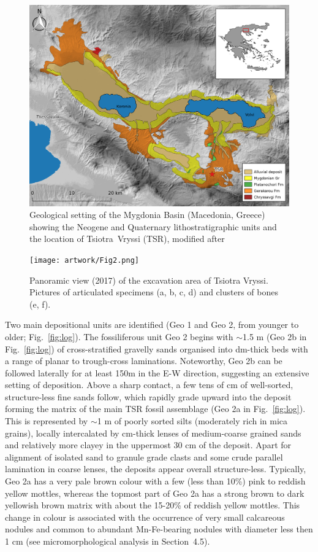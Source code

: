 \documentclass[review,times,authoryear]{elsarticle} %
\begin{document}
\begin{figure}[]
  \centering
  \includegraphics[width=1\textwidth]{artwork/Fig1.png}
  \caption{Geological setting of the Mygdonia Basin (Macedonia, Greece) showing the Neogene and Quaternary lithostratigraphic units and the location of Tsiotra~Vryssi (TSR), modified after \cite{Koufos1995}}
  \label{fig:1}
\end{figure}

\begin{figure}[]
  \centering
  \texttt{[image: artwork/Fig2.png]}
  \caption{Panoramic view (2017) of the excavation area of Tsiotra Vryssi. Pictures of articulated specimens (a, b, c, d) and clusters of bones (e, f).}
  \label{fig:pics}
\end{figure}

Two main depositional units are identified (Geo 1 and Geo 2, from younger to older; Fig.~\ref{fig:log}). The fossiliferous unit Geo 2 begins with $\sim$1.5 m (Geo 2b in Fig.~\ref{fig:log}) of cross-stratified gravelly sands organised into dm-thick beds with a range of planar to trough-cross laminations. Noteworthy, Geo 2b can be followed laterally for at least 150m in the E-W direction, suggesting an extensive setting of deposition. Above a sharp contact, a few tens of cm of well-sorted, structure-less fine sands follow, which rapidly grade upward into the deposit forming the matrix of the main TSR fossil assemblage (Geo 2a in Fig.~\ref{fig:log}). This is represented by $\sim$1 m of poorly sorted silts (moderately rich in mica grains), locally intercalated by cm-thick lenses of medium-coarse grained sands and relatively more clayey in the uppermost 30 cm of the deposit. Apart for alignment of isolated sand to granule grade clasts and some crude parallel lamination in coarse lenses, the deposits appear overall structure-less. Typically, Geo 2a has a very pale brown colour with a few (less than 10\%) pink to reddish yellow mottles, whereas the topmost part of Geo 2a has a strong brown to dark yellowish brown matrix with about the 15-20\% of reddish yellow mottles. This change in colour is associated with the occurrence of very small calcareous nodules and common to abundant Mn-Fe-bearing nodules with diameter less then 1 cm (see micromorphological analysis in Section~4.5).
\end{document}
